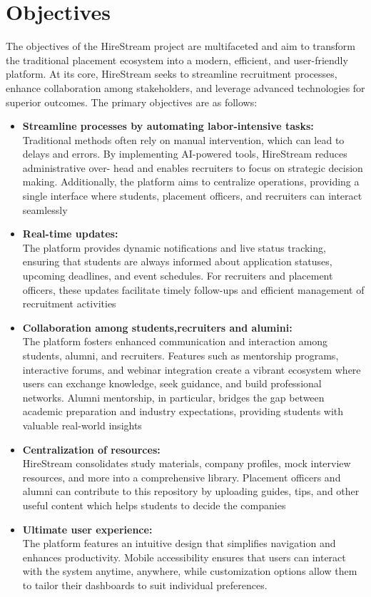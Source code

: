 \documentclass[a4paper, 12pt]{report}
\begin{document}
\newpage

\section{Objectives}
The objectives of the HireStream project are multifaceted and aim to transform the traditional placement ecosystem into a modern, efficient, and user-friendly platform. At its core, HireStream seeks to streamline recruitment processes, enhance collaboration among stakeholders, and leverage advanced technologies for superior outcomes.  
The primary objectives are as follows:

\begin{itemize}[itemsep=-4pt]
    \item \textbf{Streamline processes by automating labor-intensive tasks:}\\
        Traditional methods often rely on manual intervention, which can lead to delays and errors. By implementing AI-powered tools, HireStream reduces administrative over- head and enables recruiters to focus on strategic decision making. Additionally, the platform aims to centralize operations, providing a single interface where students, placement officers, and recruiters can interact seamlessly
    \item \textbf{Real-time updates:}\\
        The platform provides dynamic notifications and live status tracking, ensuring that students are always informed about application statuses, upcoming deadlines, and event schedules. For recruiters and placement officers, these updates facilitate timely follow-ups and efficient management of recruitment activities
    \item \textbf{Collaboration among students,recruiters and alumini:}\\
        The platform fosters enhanced communication and interaction among students, alumni, and recruiters. Features such as mentorship programs, interactive forums, and webinar integration create a vibrant ecosystem where users can exchange knowledge, seek guidance, and build professional networks. Alumni mentorship, in particular, bridges the gap between academic preparation and industry expectations, providing students with valuable real-world insights
    \item \textbf{Centralization of resources:}\\
        HireStream consolidates study materials, company profiles, mock interview resources, and more into a comprehensive library. Placement officers and alumni can contribute to this repository by uploading guides, tips, and other useful content which helps students to decide the companies
    \item \textbf{Ultimate user experience:}\\
        The platform features an intuitive design that simplifies navigation and enhances productivity. Mobile accessibility ensures that users can interact with the system anytime, anywhere, while customization options allow them to tailor their dashboards to suit individual preferences.


\end{itemize}
\end{document}
